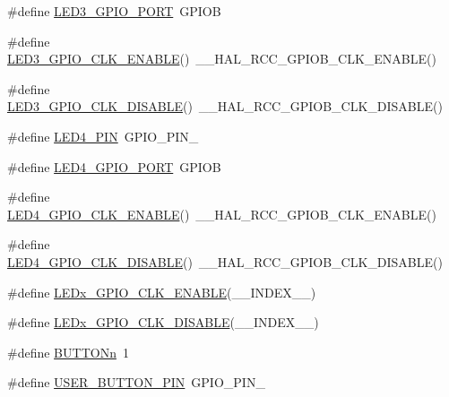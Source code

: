 \begin{DoxyCompactItemize}
\item 
\#define \hyperlink{group__B-L072Z-LRWAN1__LOW__LEVEL__LED_ga050f4b3a1f402476f9541dfe975d2143}{L\+E\+D3\+\_\+\+G\+P\+I\+O\+\_\+\+P\+O\+RT}~G\+P\+I\+OB
\item 
\#define \hyperlink{group__B-L072Z-LRWAN1__LOW__LEVEL__LED_gaac6c1162fc6bf1b60265e6fb7622e306}{L\+E\+D3\+\_\+\+G\+P\+I\+O\+\_\+\+C\+L\+K\+\_\+\+E\+N\+A\+B\+LE}()~\+\_\+\+\_\+\+H\+A\+L\+\_\+\+R\+C\+C\+\_\+\+G\+P\+I\+O\+B\+\_\+\+C\+L\+K\+\_\+\+E\+N\+A\+B\+LE()
\item 
\#define \hyperlink{group__B-L072Z-LRWAN1__LOW__LEVEL__LED_ga705278d726c1340f18576ca2d74f6e81}{L\+E\+D3\+\_\+\+G\+P\+I\+O\+\_\+\+C\+L\+K\+\_\+\+D\+I\+S\+A\+B\+LE}()~\+\_\+\+\_\+\+H\+A\+L\+\_\+\+R\+C\+C\+\_\+\+G\+P\+I\+O\+B\+\_\+\+C\+L\+K\+\_\+\+D\+I\+S\+A\+B\+LE()
\item 
\#define \hyperlink{group__B-L072Z-LRWAN1__LOW__LEVEL__LED_gaae684bb3d2f940637ccbc2adeb0e134d}{L\+E\+D4\+\_\+\+P\+IN}~G\+P\+I\+O\+\_\+\+P\+I\+N\+\_
\item 
\#define \hyperlink{group__B-L072Z-LRWAN1__LOW__LEVEL__LED_ga6b6f3eb4d23b770de265803afbc2b61b}{L\+E\+D4\+\_\+\+G\+P\+I\+O\+\_\+\+P\+O\+RT}~G\+P\+I\+OB
\item 
\#define \hyperlink{group__B-L072Z-LRWAN1__LOW__LEVEL__LED_ga301aa5a187b24af8c121a462d2b08deb}{L\+E\+D4\+\_\+\+G\+P\+I\+O\+\_\+\+C\+L\+K\+\_\+\+E\+N\+A\+B\+LE}()~\+\_\+\+\_\+\+H\+A\+L\+\_\+\+R\+C\+C\+\_\+\+G\+P\+I\+O\+B\+\_\+\+C\+L\+K\+\_\+\+E\+N\+A\+B\+LE()
\item 
\#define \hyperlink{group__B-L072Z-LRWAN1__LOW__LEVEL__LED_ga9c737fb47feaa0f730edbe5251750353}{L\+E\+D4\+\_\+\+G\+P\+I\+O\+\_\+\+C\+L\+K\+\_\+\+D\+I\+S\+A\+B\+LE}()~\+\_\+\+\_\+\+H\+A\+L\+\_\+\+R\+C\+C\+\_\+\+G\+P\+I\+O\+B\+\_\+\+C\+L\+K\+\_\+\+D\+I\+S\+A\+B\+LE()
\item 
\#define \hyperlink{group__B-L072Z-LRWAN1__LOW__LEVEL__LED_ga32faaf3f04d44e7eddce1d781587fc57}{L\+E\+Dx\+\_\+\+G\+P\+I\+O\+\_\+\+C\+L\+K\+\_\+\+E\+N\+A\+B\+LE}(\+\_\+\+\_\+\+I\+N\+D\+E\+X\+\_\+\+\_\+)
\item 
\#define \hyperlink{group__B-L072Z-LRWAN1__LOW__LEVEL__LED_gaced1ef8f2a770d8c516ebc499b291df1}{L\+E\+Dx\+\_\+\+G\+P\+I\+O\+\_\+\+C\+L\+K\+\_\+\+D\+I\+S\+A\+B\+LE}(\+\_\+\+\_\+\+I\+N\+D\+E\+X\+\_\+\+\_\+)
\item 
\#define \hyperlink{group__B-L072Z-LRWAN1__LOW__LEVEL__BUTTON_ga43d47e509ada64329393005c3be15d64}{B\+U\+T\+T\+O\+Nn}~1
\item 
\#define \hyperlink{group__B-L072Z-LRWAN1__LOW__LEVEL__BUTTON_ga34df6915e3013d6a0c74131d3946b659}{U\+S\+E\+R\+\_\+\+B\+U\+T\+T\+O\+N\+\_\+\+P\+IN}~G\+P\+I\+O\+\_\+\+P\+I\+N\+\_

\end{DoxyCompactItemize}
